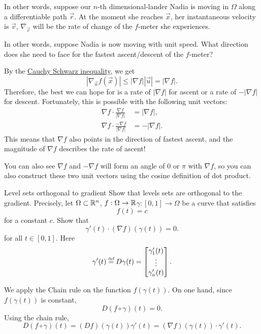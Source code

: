 In other words, suppose our $n$-th dimensional-lander Nadia is moving in $\Omega$ along a differentiable path $\vec{r}$. At the moment she reaches $\vec{x}$, her instantaneous velocity is $\vec{v}$, $\nabla_{\vec{v}}$ will be the rate of change of the $f$-meter she experiences. 

In other words, suppose Nadia is now moving with unit speed. What direction does she need to face for the fastest ascent/descent of the $f$-meter?

By the \hyperref[thm:cauchyschwarz]{Cauchy Schwarz inequality}, we get \[
|\nabla_{\vec{u}}f (\vec{x})| \leq |\nabla f||\vec{u}| = |\nabla f|.
\]
Therefore, the best we can hope for is a rate of $|\nabla f|$ for ascent or a rate of $-|\nabla f|$ for descent. Fortunately, this is possible with the following unit vectors: \begin{align*}
    \nabla f \cdot \frac{\nabla f}{|\nabla f|} &= |\nabla f|,\\
    \nabla f \cdot \frac{-\nabla f}{|\nabla f|}&= -|\nabla f|.
\end{align*}
This means that $\nabla f$ also points in the direction of fastest ascent, and the magnitude of $\nabla f$ describes the rate of ascent! 
\begin{remark}
    You can also see ${\nabla f} $ and $ -\nabla f$ will form an angle of $0$ or $\pi$ with $\nabla f$, so you can also construct these two unit vectors using the cosine definition of dot product.
\end{remark}
\begin{aexample}{Level sets orthogonal to gradient}{}
    Show that levels sets are orthogonal to the gradient. Precisely, let $\Omega\subset \mathbb{R}^n$, $f:\Omega \to \mathbb{R}$$\gamma:[0,1]\to \Omega$ be a curve that satisfies \[
    f(t)=c
    \]
    for a constant $c$. Show that \[
        \gamma'(t) \cdot (\nabla f)(\gamma(t))=0.
    \]
    for all $t\in [0,1]$. Here \[
    \gamma'(t) \defeq D\gamma(t) = \begin{bmatrix}
        \gamma_1'(t)\\\vdots\\\gamma_n'(t)
    \end{bmatrix}.
    \]
\end{aexample}
We apply the Chain rule on the function $f(\gamma(t))$.
On one hand, since $f(\gamma(t))$ is constant, \[
D(f\circ \gamma) (t) = 0.
\]
Using the chain rule, \[
    D(f\circ \gamma) (t) = (Df)(\gamma(t)) \gamma'(t) = (\nabla f)(\gamma(t)) \cdot \gamma'(t).
\]
